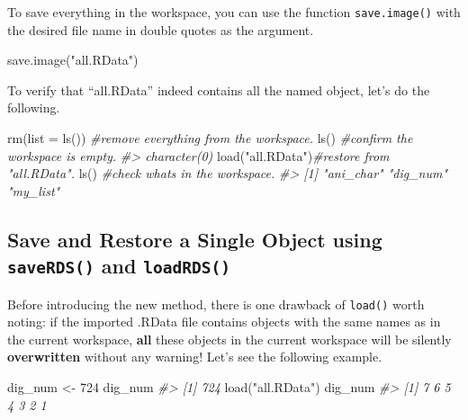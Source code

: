 \documentclass[
]{book}
\newenvironment{Shaded}{\begin{snugshade}}{\end{snugshade}}
\newcommand{\AttributeTok}[1]{\textcolor[rgb]{0.77,0.63,0.00}{#1}}
\newcommand{\CommentTok}[1]{\textcolor[rgb]{0.56,0.35,0.01}{\textit{#1}}}
\newcommand{\DecValTok}[1]{\textcolor[rgb]{0.00,0.00,0.81}{#1}}
\newcommand{\FunctionTok}[1]{\textcolor[rgb]{0.00,0.00,0.00}{#1}}
\newcommand{\NormalTok}[1]{#1}
\newcommand{\OtherTok}[1]{\textcolor[rgb]{0.56,0.35,0.01}{#1}}
\newcommand{\StringTok}[1]{\textcolor[rgb]{0.31,0.60,0.02}{#1}}
\begin{document}
To save everything in the workspace, you can use the function \texttt{save.image()} with the desired file name in double quotes as the argument.

\begin{Shaded}
\begin{Highlighting}[]
\FunctionTok{save.image}\NormalTok{(}\StringTok{"all.RData"}\NormalTok{)}
\end{Highlighting}
\end{Shaded}

To verify that ``all.RData'' indeed contains all the named object, let's do the following.

\begin{Shaded}
\begin{Highlighting}[]
\FunctionTok{rm}\NormalTok{(}\AttributeTok{list =} \FunctionTok{ls}\NormalTok{())  }\CommentTok{\#remove everything from the workspace.}
\FunctionTok{ls}\NormalTok{()             }\CommentTok{\#confirm the workspace is empty.}
\CommentTok{\#\textgreater{} character(0)}
\FunctionTok{load}\NormalTok{(}\StringTok{"all.RData"}\NormalTok{)}\CommentTok{\#restore from "all.RData".}
\FunctionTok{ls}\NormalTok{()             }\CommentTok{\#check what\textquotesingle{}s in the workspace.}
\CommentTok{\#\textgreater{} [1] "ani\_char" "dig\_num"  "my\_list"}
\end{Highlighting}
\end{Shaded}

\hypertarget{save-and-restore-a-single-object-using-saverds-and-loadrds}{%
\subsection{\texorpdfstring{Save and Restore a Single Object using \texttt{saveRDS()} and \texttt{loadRDS()}}{Save and Restore a Single Object using saveRDS() and loadRDS()}}\label{save-and-restore-a-single-object-using-saverds-and-loadrds}}

Before introducing the new method, there is one drawback of \texttt{load()} worth noting: if the imported .RData file contains objects with the same names as in the current workspace, \textbf{all} these objects in the current workspace will be silently \textbf{overwritten} without any warning! Let's see the following example.

\begin{Shaded}
\begin{Highlighting}[]
\NormalTok{dig\_num }\OtherTok{\textless{}{-}} \DecValTok{724}
\NormalTok{dig\_num}
\CommentTok{\#\textgreater{} [1] 724}
\FunctionTok{load}\NormalTok{(}\StringTok{"all.RData"}\NormalTok{)}
\NormalTok{dig\_num}
\CommentTok{\#\textgreater{} [1] 7 6 5 4 3 2 1}
\end{Highlighting}
\end{Shaded}
\end{document}
